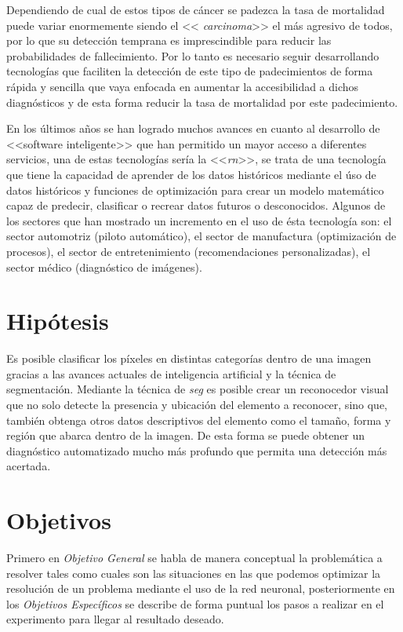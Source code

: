 Dependiendo de cual de estos tipos de cáncer se padezca la tasa de mortalidad puede variar enormemente siendo el << \emph{carcinoma}>> el más agresivo de todos, por lo que su detección temprana es imprescindible para reducir las probabilidades de fallecimiento. Por lo tanto es necesario seguir desarrollando tecnologías que faciliten la detección de este tipo de padecimientos de forma rápida y sencilla que vaya enfocada en aumentar la accesibilidad a dichos diagnósticos y de esta forma reducir la tasa de mortalidad por este padecimiento.

En los últimos años se han logrado muchos avances en cuanto al desarrollo de <<software inteligente>> que han permitido un mayor acceso a diferentes servicios, una de estas tecnologías sería la <<\emph{\gls{rn}}>>, se trata de una tecnología que tiene la capacidad de aprender de los datos históricos mediante el úso de datos históricos y funciones de optimización para crear un modelo matemático capaz de predecir, clasificar o recrear datos futuros o desconocidos. Algunos de los sectores que han mostrado un incremento en el uso de ésta tecnología son: el sector automotriz (piloto automático), el sector de manufactura (optimización de procesos), el sector de entretenimiento (recomendaciones personalizadas), el sector médico (diagnóstico de imágenes). 


\section{Hipótesis}
Es posible clasificar los píxeles en distintas categorías dentro de una imagen gracias a las avances actuales de inteligencia artificial y la técnica de segmentación. Mediante la técnica de \emph{\gls{seg}} es posible crear un reconocedor visual que no solo detecte la presencia y ubicación del elemento a reconocer, sino que, también obtenga otros datos descriptivos del elemento como el tamaño, forma y región que abarca dentro de la imagen. De esta forma se puede obtener un diagnóstico automatizado mucho más profundo que permita una detección más acertada.

\section{Objetivos}
Primero en \emph{Objetivo General} se habla de manera conceptual la problemática a resolver tales como cuales son las situaciones en las que podemos optimizar la resolución de un problema mediante el uso de la red neuronal, posteriormente en los \emph{Objetivos Específicos} se describe de forma puntual los pasos a realizar en el experimento para llegar al resultado deseado.

